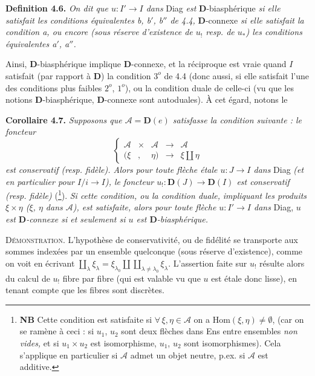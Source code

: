 \documentclass[11pt]{article}
\newcommand{\printedpage}[1]{\marginpar{\footnotesize p.~#1}}
\def\dcprintedpending{}
\newcommand{\msp}[1]{\marginpar{\footnotesize\raggedright
  \ifx\dcprintedpending\empty\else p.~\dcprintedpending\par\fi
  [#1]}\gdef\dcprintedpending{}}
\newcommand{\D}{\mathbf{D}}
\begin{document}
\msp{page 63bis}

\textbf{Definition 4.6.} \textit{On dit que $u : I' \longrightarrow I$ dans} Diag \textit{est} $\D$-biasphérique \textit{si elle satisfait les conditions équivalentes b, b$'$, b$''$ de 4.4,} $\D$-connexe \textit{si elle satisfait la condition a, ou encore (sous réserve d'existence de $u_!$ resp. de $u_*$) les conditions équivalentes a$'$, a$''$.} %

Ainsi, $\D$-biasphérique implique $\D$-connexe, et la réciproque est vraie quand $I$ satisfait (par rapport à $\D$) la condition $3^o$ de 4.4 (donc aussi, si elle satisfait l'une des conditions plus faibles $2^o$, $1^o$), ou la condition duale de celle-ci (vu que les notions $\D$-biasphérique, $\D$-connexe sont autoduales). À cet égard, notons le

\textbf{Corollaire 4.7.} \textit{Supposons que $\mathcal{A} = \D(e)$ satisfasse la condition suivante : le foncteur}
\[
\left\{
\begin{array}{lcccl}
\mathcal{A} & \times & \mathcal{A} & \longrightarrow & \mathcal{A} \\[1ex]
(\xi & , & \eta) & \longrightarrow & \xi \amalg \eta
\end{array}
\right.
\]
\textit{est conservatif (resp. fidèle). Alors pour toute flèche étale $u : J \longrightarrow I$ dans} Diag \textit{(et en particulier pour $I/i \longrightarrow I$), le foncteur $u_! : \D(J) \longrightarrow \D(I)$ est conservatif (resp. fidèle)} (\footnote{\textbf{NB} Cette condition est satisfaite si $\forall\, \xi, \eta \in \mathcal{A}$ on a $\mathrm{Hom}(\xi,\eta) \neq \emptyset$, (car on se ramène à ceci : si $u_1$,
$u_2$ sont deux flèches dans Ens entre ensembles \textit{non vides,} et si $u_1 \times u_2$ est isomorphisme, $u_1$, $u_2$ sont isomorphismes). Cela s'applique en particulier si $\mathcal{A}$ admet un objet neutre, p.ex. si $\mathcal{A}$ est additive.}). \textit{Si cette condition, ou la condition duale,}
\printedpage{40}
\msp{page 64bis}
\textit{impliquant les produits $\xi\times\eta$ ($\xi$, $\eta$ dans $\mathcal{A}$), est satisfaite, alors pour toute flèche $u : I' \longrightarrow I$ dans} Diag, \textit{$u$ est $\D$-connexe si et seulement si $u$ est $\D$-biasphérique.}

\textsc{Démonstration.} L'hypothèse de conservativité, ou de fidélité se transporte aux sommes indexées par un ensemble quelconque (sous réserve d'existence), comme on voit en écrivant $\coprod\limits_{\lambda} \xi_\lambda = \xi_{\lambda_0} \amalg \coprod\limits_{\lambda\neq\lambda_0} \xi_\lambda$. L'assertion faite sur $u_!$ résulte alors du calcul de $u_!$ fibre par fibre (qui est valable vu que $u$ est étale donc lisse), en tenant compte que les fibres sont discrètes.
\end{document}
